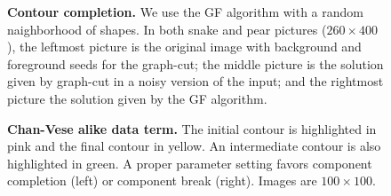 \documentclass[smallextended]{svjour3}
\begin{document}
\begin{figure}
\caption{\textbf{Contour completion.} We use the GF algorithm with a random naighborhood of shapes. In both snake and pear pictures ($260\times400$), the leftmost picture is the original image with background and foreground seeds for the graph-cut; the middle picture is the solution given by graph-cut in a noisy version of the input; and the rightmost picture the solution given by the GF algorithm.}
\label{fig:GF-completion}
\end{figure}

\begin{figure}
\center
{}\hspace{1em}%
%
\caption{\textbf{Chan-Vese alike data term.} The initial contour is highlighted in pink and the final contour in yellow. An intermediate contour is also highlighted in green. A proper parameter setting favors component completion (left) or component break (right). Images are $100\times100$. }
\label{fig:GF-chan-vese-alike}
\end{figure}
\end{document}
